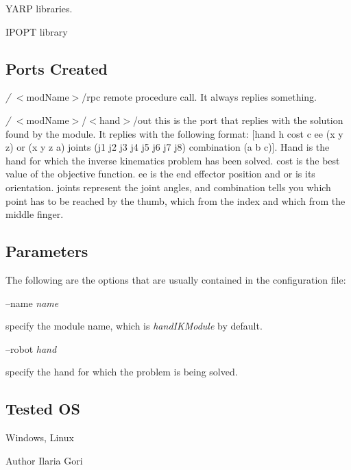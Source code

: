 \begin{DoxyItemize}
\item Y\+A\+RP libraries.
\item I\+P\+O\+PT library
\end{DoxyItemize}\hypertarget{group__handIKModule_portsc_sec}{}\subsection{Ports Created}\label{group__handIKModule_portsc_sec}

\begin{DoxyItemize}
\item {\itshape /} $<$mod\+Name$>$/rpc remote procedure call. It always replies something.
\item {\itshape /} $<$mod\+Name$>$/$<$hand$>$/out this is the port that replies with the solution found by the module. It replies with the following format\+: \mbox{[}hand h cost c ee (x y z) or (x y z a) joints (j1 j2 j3 j4 j5 j6 j7 j8) combination (a b c)\mbox{]}. Hand is the hand for which the inverse kinematics problem has been solved. cost is the best value of the objective function. ee is the end effector position and or is its orientation. joints represent the joint angles, and combination tells you which point has to be reached by the thumb, which from the index and which from the middle finger.
\end{DoxyItemize}\hypertarget{group__handIKModule_parameters_sec}{}\subsection{Parameters}\label{group__handIKModule_parameters_sec}
The following are the options that are usually contained in the configuration file\+:

--name {\itshape name} 
\begin{DoxyItemize}
\item specify the module name, which is {\itshape hand\+I\+K\+Module} by default.
\end{DoxyItemize}

--robot {\itshape hand} 
\begin{DoxyItemize}
\item specify the hand for which the problem is being solved.
\end{DoxyItemize}\hypertarget{group__handIKModule_tested_os_sec}{}\subsection{Tested OS}\label{group__handIKModule_tested_os_sec}
Windows, Linux

\begin{DoxyAuthor}{Author}
Ilaria Gori 
\end{DoxyAuthor}
